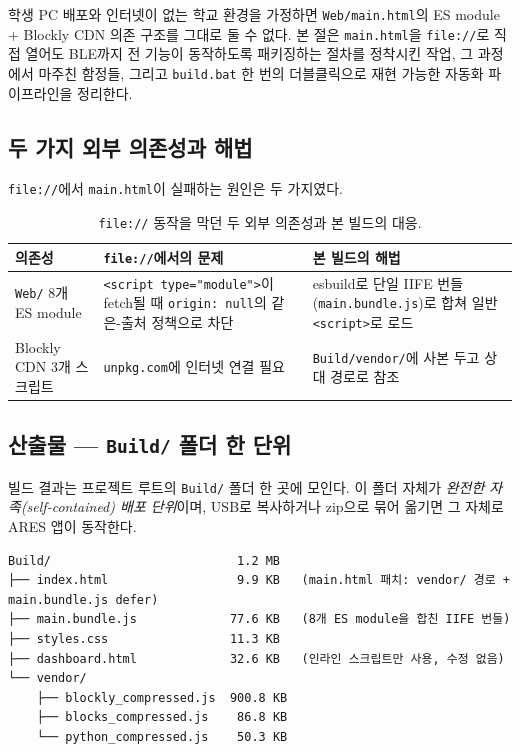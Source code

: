 \documentclass[11pt, oneside]{article}
\begin{document}
학생 PC 배포와 인터넷이 없는 학교 환경을 가정하면 \texttt{Web/main.html}의
ES module + Blockly CDN 의존 구조를 그대로 둘 수 없다. 본 절은
\texttt{main.html}을 \texttt{file://}로 직접 열어도 BLE까지 전 기능이
동작하도록 패키징하는 절차를 정착시킨 작업, 그 과정에서 마주친 함정들,
그리고 \texttt{build.bat} 한 번의 더블클릭으로 재현 가능한 자동화
파이프라인을 정리한다.

\subsection{두 가지 외부 의존성과 해법}

\texttt{file://}에서 \texttt{main.html}이 실패하는 원인은 두 가지였다.

\begin{table}[h]
\centering
\small
\begin{tabularx}{\linewidth}{@{}lXX@{}}
\toprule
의존성 & \texttt{file://}에서의 문제 & 본 빌드의 해법 \\
\midrule
\texttt{Web/} 8개 ES module & \texttt{<script type="module">}이 fetch될 때 \texttt{origin: null}의 같은-출처 정책으로 차단 & esbuild로 단일 IIFE 번들(\texttt{main.bundle.js})로 합쳐 일반 \texttt{<script>}로 로드 \\
Blockly CDN 3개 스크립트 & \texttt{unpkg.com}에 인터넷 연결 필요 & \texttt{Build/vendor/}에 사본 두고 상대 경로로 참조 \\
\bottomrule
\end{tabularx}
\caption{\texttt{file://} 동작을 막던 두 외부 의존성과 본 빌드의 대응.}
\end{table}

\subsection{산출물 --- \texttt{Build/} 폴더 한 단위}

빌드 결과는 프로젝트 루트의 \texttt{Build/} 폴더 한 곳에 모인다. 이
폴더 자체가 \emph{완전한 자족(self-contained) 배포 단위}이며, USB로
복사하거나 zip으로 묶어 옮기면 그 자체로 ARES 앱이 동작한다.

\begin{verbatim}
Build/                          1.2 MB
├── index.html                  9.9 KB   (main.html 패치: vendor/ 경로 + main.bundle.js defer)
├── main.bundle.js             77.6 KB   (8개 ES module을 합친 IIFE 번들)
├── styles.css                 11.3 KB
├── dashboard.html             32.6 KB   (인라인 스크립트만 사용, 수정 없음)
└── vendor/
    ├── blockly_compressed.js  900.8 KB
    ├── blocks_compressed.js    86.8 KB
    └── python_compressed.js    50.3 KB
\end{verbatim}
\end{document}
